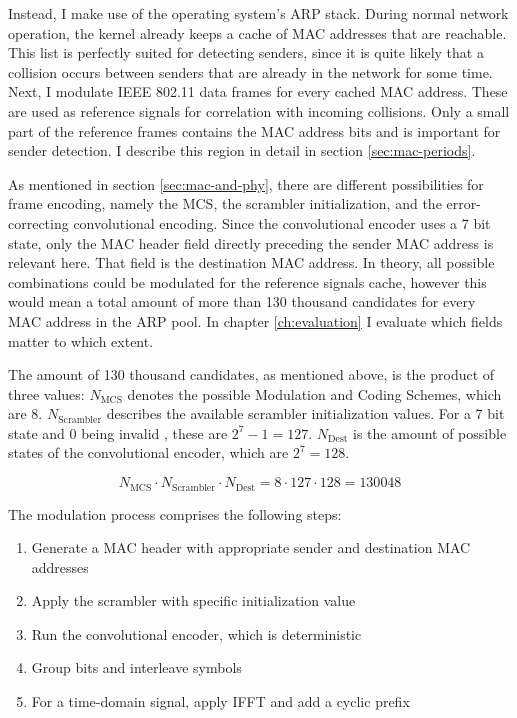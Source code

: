 Instead, I make use of the operating system's \gls{ARP} stack. During normal network operation, the kernel already keeps a cache of \gls{MAC} addresses that are reachable. This list is perfectly suited for detecting senders, since it is quite likely that a collision occurs between senders that are already in the network for some time.\\

Next, I modulate IEEE 802.11 data frames for every cached \gls{MAC} address. These are used as reference signals for correlation with incoming collisions. Only a small part of the reference frames contains the \gls{MAC} address bits and is important for sender detection. I describe this region in detail in section \ref{sec:mac-periods}.

As mentioned in section \ref{sec:mac-and-phy}, there are different possibilities for frame encoding, namely the \gls{MCS}, the scrambler initialization, and the error-correcting convolutional encoding. Since the convolutional encoder uses a 7 bit state, only the \gls{MAC} header field directly preceding the sender \gls{MAC} address is relevant here. That field is the destination \gls{MAC} address. In theory, all possible combinations could be modulated for the reference signals cache, however this would mean a total amount of  more than 130 thousand candidates for every \gls{MAC} address in the ARP pool. In chapter \ref{ch:evaluation} I evaluate which fields matter to which extent.

The amount of 130 thousand candidates, as mentioned above, is the product of three values: $ N_{\text{MCS}} $ denotes the possible Modulation and Coding Schemes, which are 8. $ N_{\text{Scrambler}} $ describes the available scrambler initialization values. For a 7 bit state and 0 being invalid \cite{ieee2012}, these are $ 2^7 - 1 = 127 $. $ N_{\text{Dest}} $ is the amount of possible states of the convolutional encoder, which are $ 2^7 = 128 $.

$$ N_{\text{MCS}} \cdot N_{\text{Scrambler}} \cdot N_{\text{Dest}} = 8 \cdot 127 \cdot 128 = 130 048 $$\vspace{0cm}

The modulation process comprises the following steps:

\begin{enumerate}
	\item Generate a \gls{MAC} header with appropriate sender and destination \gls{MAC} addresses
	\item Apply the scrambler with specific initialization value
	\item Run the convolutional encoder, which is deterministic
	\item Group bits and interleave symbols
	\item For a time-domain signal, apply \gls{IFFT} and add a cyclic prefix
\end{enumerate}

